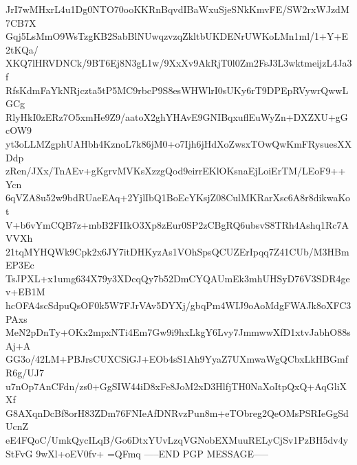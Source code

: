 JrI7wMHxrL4u1Dg0NTO70ooKKRnBqvdIBaWxuSjeSNkKmvFE/SW2rxWJzdM7CB7X
Gqj5LsMmO9WsTzgKB2SabBlNUwqzvzqZkltbUKDENrUWKoLMn1ml/1+Y+E2tKQa/
XKQ7lHRVDNCk/9BT6Ej8N3gL1w/9XxXv9AkRjT0l0Zm2FsJ3L3wktmeijzL4Ja3f
RfsKdmFaYkNRjczta5tP5MC9rbcP9S8esWHWlrI0sUKy6rT9DPEpRVywrQwwLGCg
RlyHkI0zERz7O5xmHe9Z9/aatoX2ghYHAvE9GNIBqxuflEuWyZn+DXZXU+gGcOW9
yt3oLLMZgphUAHbh4KznoL7k86jM0+o7Ijh6jHdXoZwsxTOwQwKmFRysuesXXDdp
zRen/JXx/TnAEv+gKgrvMVKsXzzgQod9eirrEKlOKsnaEjLoiErTM/LEoF9++Ycn
6qVZA8u52w9bdRUaeEAq+2YjlIbQ1BoEcYKsjZ08CulMKRarXsc6A8r8dikwaKot
V+b6vYmCQB7z+mbB2FIIkO3Xp8zEur0SP2zCBgRQ6ubsvS8TRh4Ashq1Rc7AVVXh
21tqMYHQWk9Cpk2x6JY7itDHKyzAs1VOhSpsQCUZErIpqq7Z41CUb/M3HBmEP3Ec
TsJPXL+x1umg634X79y3XDcqQy7b52DmCYQAUmEk3mhUHSyD76V3SDR4gev+EB1M
hcOFA4scSdpuQsOF0k5W7FJrVAv5DYXj/gbqPm4WIJ9oAoMdgFWAJk8oXFC3PAxs
MeN2pDnTy+OKx2mpxNTi4Em7Gw9i9hxLkgY6Lvy7JmmwwXfD1xtvJabhO88sAj+A
GG3o/42LM+PBJrsCUXCSiGJ+EOb4sS1Ah9YyaZ7UXmwaWgQCbxLkHBGmfR6g/UJ7
u7nOp7AnCFdn/zs0+GgSIW44iD8xFe8JoM2xD3HlfjTH0NaXoItpQxQ+AqGliXXf
G8AXqnDcBf8orH83ZDm76FNIeAfDNRvzPun8m+eTObreg2QeOMsPSRIeGgSdUcnZ
eE4FQoC/UmkQycILqB/Go6DtxYUvLzqVGNobEXMuuRELyCjSv1PzBH5dv4yStFvG
9wXl+oEV0fv+
=QFmq
-----END PGP MESSAGE-----
